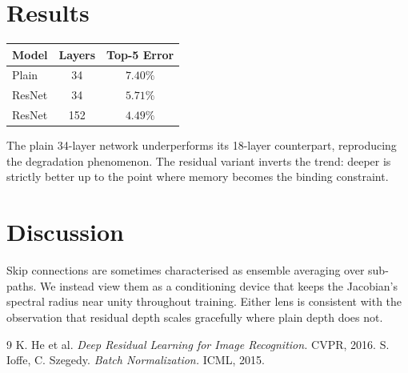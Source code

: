\documentclass[11pt]{article}
\begin{document}
\section{Results}
\begin{tabular}{lcc}
\hline
Model & Layers & Top-5 Error \\
\hline
Plain & 34  & $7.40\%$ \\
ResNet & 34  & $5.71\%$ \\
ResNet & 152 & $4.49\%$ \\
\hline
\end{tabular}

The plain 34-layer network underperforms its 18-layer counterpart, reproducing
the degradation phenomenon. The residual variant inverts the trend: deeper is
strictly better up to the point where memory becomes the binding constraint.

\section{Discussion}
Skip connections are sometimes characterised as ensemble averaging over
sub-paths. We instead view them as a conditioning device that keeps the
Jacobian's spectral radius near unity throughout training. Either lens is
consistent with the observation that residual depth scales gracefully where
plain depth does not.


\begin{thebibliography}{9}
 K. He et al. \emph{Deep Residual Learning for Image Recognition.} CVPR, 2016.
 S. Ioffe, C. Szegedy. \emph{Batch Normalization.} ICML, 2015.
\end{thebibliography}
\end{document}
